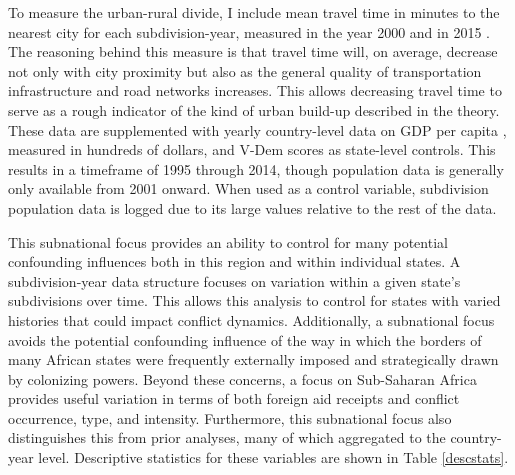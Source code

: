 \documentclass[12pt, letterpaper]{article}
\renewcommand{\cite}{\citep}
\begin{document}
	To measure the urban-rural divide, I include mean travel time in minutes to the nearest city for each subdivision-year, measured in the year 2000 \cite{citytime2000} and in 2015 \cite{citytime2015}. The reasoning behind this measure is that travel time will, on average, decrease not only with city proximity but also as the general quality of transportation infrastructure and road networks increases. This allows decreasing travel time to serve as a rough indicator of the kind of urban build-up described in the theory. These data are supplemented with yearly country-level data on GDP per capita \cite{wb2022}, measured in hundreds of dollars, and V-Dem scores \cite{vdem2023, pemstein2018v} as state-level controls. This results in a timeframe of 1995 through 2014, though population data is generally only available from 2001 onward. When used as a control variable, subdivision population data is logged due to its large values relative to the rest of the data.
	
	This subnational focus provides an ability to control for many potential confounding influences both in this region and within individual states. A subdivision-year data structure focuses on variation within a given state’s subdivisions over time. This allows this analysis to control for states with varied histories that could impact conflict dynamics. Additionally, a subnational focus avoids the potential confounding influence of the way in which the borders of many African states were frequently externally imposed and strategically drawn by colonizing powers. Beyond these concerns, a focus on Sub-Saharan Africa provides useful variation in terms of both foreign aid receipts and conflict occurrence, type, and intensity. Furthermore, this subnational focus also distinguishes this from prior analyses, many of which aggregated to the country-year level. Descriptive statistics for these variables are shown in Table \ref{descstats}.
	
\end{document}
